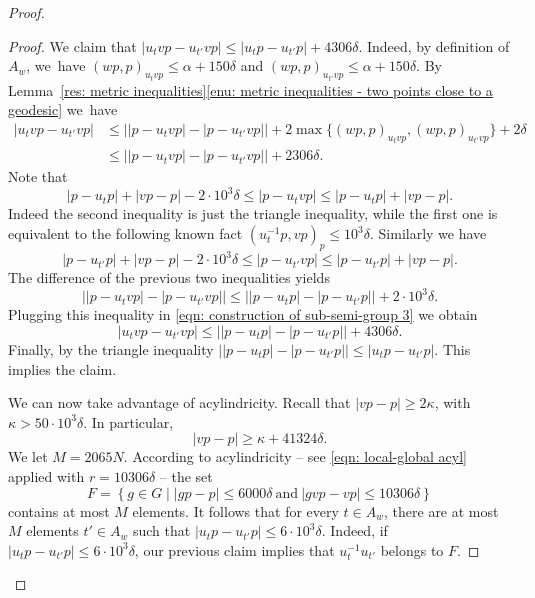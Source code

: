 \documentclass[JEP,XML,SOM,Unicode, NoEqCountersInSection,published]{cedram}
\theoremstyle{plain}
\theoremstyle{definition}
\begin{document}
\begin{proof}
\begin{proof}
We claim that $|u_tvp - u_{t'}vp| \leq |u_tp -u_{t'}p| +4306\delta$.
Indeed, by definition of $A_w$, we~have $(wp,p)_{u_tvp} \leq \alpha + 150\delta$ and $(wp,p)_{u_{t'}vp} \leq \alpha + 150\delta$.
By Lemma~\ref{res: metric inequalities}\eqref{enu: metric inequalities - two points close to a geodesic} we~have%
\begin{equation}
\label{eqn: construction of sub-semi-group 3}
\begin{split}
|u_tvp - u_{t'}vp|
& \leq \bigl||p - u_tvp| \!-\! |p-u_{t'}vp|\bigr| \!+\! 2 \max\{ (wp,p)_{u_tvp}, (wp,p)_{u_{t'}vp}\} \!+\! 2\delta \\
& \leq \bigl||p - u_tvp| \!-\! |p-u_{t'}vp|\bigr| \!+\! 2306\delta.
\end{split}
\end{equation}
Note that
\begin{equation*}
|p-u_tp| +|vp-p| - 2\cdot 10^3\delta \leq |p - u_tvp|\leq |p-u_tp| +|vp-p|.
\end{equation*}
Indeed the second inequality is just the triangle inequality, while the first one is equivalent to the following known fact $(u_t^{-1}p,vp)_p\leqslant 10^3\delta$.
Similarly we have
\begin{equation*}
|p-u_{t'}p| +|vp-p| - 2\cdot 10^3\delta \leq |p - u_{t'}vp|\leq |p-u_{t'}p| +|vp-p|.
\end{equation*}
The difference of the previous two inequalities yields
\begin{equation*}
\bigl||p - u_tvp| - |p-u_{t'}vp|\bigr| \leq \bigl| |p - u_tp| - |p - u_{t'}p|\bigr| + 2\cdot 10^3\delta.
\end{equation*}
Plugging this inequality in \eqref{eqn: construction of sub-semi-group 3} we obtain
\begin{equation*}
|u_tvp - u_{t'}vp| \leq \bigl| |p - u_tp| - |p - u_{t'}p|\bigr| + 4306 \delta.
\end{equation*}
Finally, by the triangle inequality
$
\bigl | |p - u_tp| - |p - u_{t'}p|\bigr| \leq |u_tp-u_{t'}p| .
$
This implies the claim.

We can now take advantage of acylindricity.
Recall that $|vp - p| \geq 2\kappa$, with $\kappa > 50 \cdot 10^3\delta$.
In particular,
\begin{equation*}
|vp - p| \geq \kappa + 41324\delta.
\end{equation*}
We let $M = 2065N$.
According to acylindricity -- see \eqref{eqn: local-global acyl} applied with $r = 10306\delta$ -- the set
\begin{equation*}
F = \left\{ g \in G \mid |gp - p| \leq 6000\delta\ \text{and} \ |gvp - vp| \leq 10306\delta \right\}
\end{equation*}
contains at most $M$ elements.
It follows that for every $t \in A_w$, there are at most $M$ elements $t' \in A_w$ such that $|u_tp - u_{t'}p| \leq 6\cdot 10^3\delta$.
Indeed, if $|u_tp - u_{t'}p| \leq 6\cdot 10^3\delta$, our previous claim implies that $u_t^{-1}u_{t'}$ belongs to $F$.


\end{proof}
\end{proof}
\end{document}
